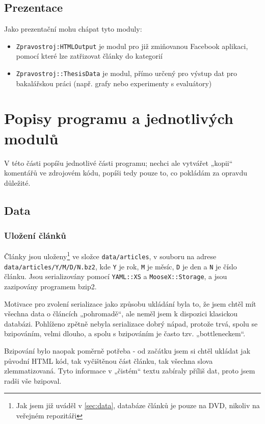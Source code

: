\documentclass[12pt,a4paper]{report}
\def\uv#1{„#1“}
\begin{document}
\section{Prezentace}
Jako prezentační mohu chápat tyto moduly:
\begin{itemize}
	\item \texttt{Zpravostroj:HTMLOutput} je modul pro již zmiňovanou Facebook aplikaci, pomocí které lze zatřizovat články do kategorií
	\item \texttt{Zpravostroj::ThesisData} je modul, přímo určený pro výstup dat pro bakalářskou práci (např. grafy nebo experimenty s evaluátory)
\end{itemize}

\chapter{Popisy programu a jednotlivých modulů}

V této části popíšu jednotlivé části programu; nechci ale vytvářet \uv{kopii} komentářů ve zdrojovém kódu, popíši tedy pouze to, co pokládám za opravdu důležité.

\section{Data}
		
\subsection{Uložení článků}

Články jsou uloženy\footnote{Jak jsem již uváděl v \ref{sec:data}, databáze článků je pouze na DVD, nikoliv na veřejném repozitáři} ve složce \texttt{data/articles}, v souboru na adrese \texttt{data/articles/Y/M/D/N.bz2}, kde \texttt{Y} je rok, \texttt{M} je měsíc, \texttt{D} je den a \texttt{N} je číslo článku. Jsou serializovány pomocí \texttt{YAML::XS} a \texttt{MooseX::Storage}, a jsou zazipovány programem bzip2.

Motivace pro zvolení serializace jako způsobu ukládání byla to, že jsem chtěl mít všechna data o článcích \uv{pohromadě}, ale neměl jsem k dispozici klasickou databázi. Pohlíženo zpětně nebyla serializace dobrý nápad, protože trvá, spolu se bzipováním, velmi dlouho, a spolu s bzipováním je často tzv. \uv{bottleneckem}.

Bzipování bylo naopak poměrně potřeba - od začátku jsem si chtěl ukládat jak původní HTML kód, tak vyčištěnou část článku, tak všechna slova zlemmatizovaná. Tyto informace v \uv{čistém} textu zabíraly příliš dat, proto jsem radši vše bzipoval.
\end{document}
